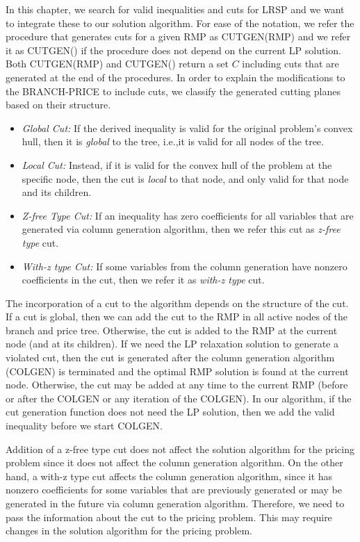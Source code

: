 In this chapter, we search for valid inequalities and cuts for LRSP
and we want to integrate these to our solution algorithm. For ease of
the notation, we refer the procedure that generates cuts for a given
RMP as CUTGEN(RMP) and we refer it as CUTGEN() if the procedure does
not depend on the current LP solution. Both CUTGEN(RMP) and CUTGEN()
return a set $C$ including cuts that are generated at the end of
the procedures. In order to explain the modifications to the
BRANCH-PRICE to include cuts, we classify the generated cutting planes
based on their structure.
\begin{itemize}
\item {\em Global Cut:} If the derived inequality is valid for the
original problem's convex hull, then it is {\em global} to the tree,
i.e.,it is valid for all nodes of the tree.
\item {\em Local Cut:} Instead, if it is valid for the
convex hull of the problem at the specific node, then the cut is
{\em local} to that node, and only valid for that node and its
children.
\item {\em Z-free Type Cut:} If an inequality has zero coefficients
for all variables that are generated via column generation algorithm,
then we refer this cut as {\em z-free type} cut.
\item {\em With-z type Cut:} If some variables from the column generation
have nonzero coefficients in the cut, then we refer it as {\em with-z type}
cut.
\end{itemize}
The incorporation of a cut to the algorithm depends on the structure of
the cut. If a cut is global, then we can add the cut to the RMP in all
active nodes of the branch and price tree. Otherwise, the cut is added to
the RMP at the current node (and at its children). If we need the LP
relaxation solution to generate a violated cut, then the cut is generated
after the column generation algorithm (COLGEN) is terminated and the optimal
RMP solution is found at the current node. Otherwise, the cut may be added at
any time to the current RMP (before or after the COLGEN
or any iteration of the COLGEN). In our algorithm, if the cut
generation function does not need the LP solution, then we add the
valid inequality before we start COLGEN.

Addition of a z-free type cut does not affect the solution algorithm for
the pricing problem since it does not affect the column generation algorithm.
On the other hand, a with-z type cut affects the column
generation algorithm, since it has nonzero coefficients for some
variables that are previously generated or may be generated in the future
via column generation algorithm. Therefore, we need to pass the information
about the cut to the pricing problem. This may require changes in the solution
algorithm for the pricing problem.

